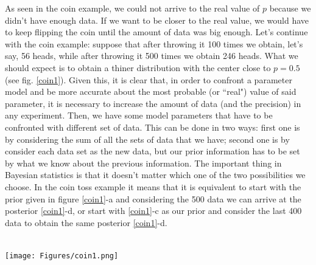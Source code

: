 \documentclass[onecolumn,           %
               showpacs,            %
               preprintnumbers,     %
               aps,                 %
               letterpaper,             %
               superscriptaddress,      %
               nofootinbib,         %
               tightenlines,        %
               floats,floatfix      %
               ,usenatbib,
               ]{revtex4-1}
\begin{document}
As seen in the coin example, we could not arrive to the real value of $p$ because we didn't have enough data. If we want to be closer to the real value, we would have to keep flipping the coin until the amount of data was big enough. Let's continue with the coin example: suppose that after throwing it 100 times we obtain, let's say, 56 heads, while after throwing it 500 times we obtain 246 heads. What we should expect is to obtain a thiner distribution with the center close to $p=0.5$ (see fig. \ref{coin1}). Given this, it is clear that, in order to confront a parameter model and be more accurate about the most probable (or ``real") value of said parameter, it is necessary to increase the amount of data (and the precision) in any experiment. 
Then, we have some model parameters that have to be confronted with different set of data. This can be done in two ways: first one is by considering the sum of all the sets of data that we have; second one is by consider each data set as the new data, but our prior information has to be set by what we know about the previous information. The important thing in Bayesian statistics is that it doesn't matter which one of the two possibilities we choose. In the coin toss example it means that it is equivalent to start with the prior given in figure \ref{coin1}-a and considering the 500 data we can arrive at the posterior \ref{coin1}-d, or start with \ref{coin1}-c as our prior and consider the last 400 data to obtain the same posterior \ref{coin1}-d. \\ $ $ \\
\begin{minipage}{\textwidth}
\centering
\texttt{[image: Figures/coin1.png]}
\label{coin1}
\end{minipage}
\\$ $ \\
\end{document}
